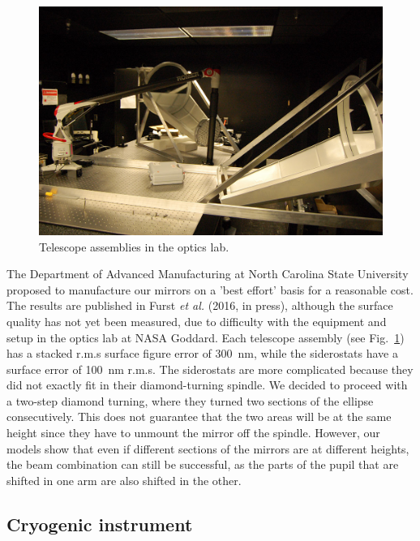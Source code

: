 \begin{figure}[!h]
		\centering
		\includegraphics[width=\textwidth]{Figures/TelescopeAssemblies.jpg} 
		\caption[Telescope assemblies]{Telescope assemblies in the optics lab.}
		\label{fig:TelescopeAssemblies}
\end{figure}



The Department of Advanced Manufacturing at North Carolina State University proposed to manufacture our mirrors on a 'best effort' basis for a reasonable cost.  The results are published in Furst \textit{et al.} (2016, in press), although the surface quality has not yet been measured, due to difficulty with the equipment  and setup in the optics lab at NASA Goddard. Each telescope assembly (see Fig.~\ref{fig:TelescopeAssemblies}) has a stacked r.m.s surface figure error of \SI{300}{\nano\meter}, while the siderostats have a surface error of \SI{100}{\nano\meter} r.m.s. The siderostats are more complicated because they did not exactly fit in their diamond-turning spindle. We decided to proceed with a two-step diamond turning, where they turned two sections of the ellipse consecutively. This does not guarantee that the two areas will be at the same height since they have to unmount the mirror off the spindle. However, our models show that even if different sections of the mirrors are at different heights, the beam combination can still be successful, as the parts of the pupil that are shifted in one arm are also shifted in the other. 




\subsection{Cryogenic instrument}

